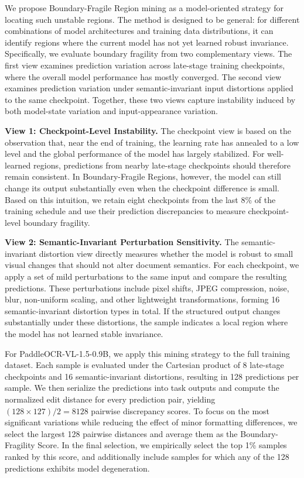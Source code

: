 \documentclass[11pt, a4paper,logo,  copyright, nonumbering]{paddleocr}
\begin{document}
We propose Boundary-Fragile Region mining as a model-oriented strategy for locating such unstable regions. The method is designed to be general: for different combinations of model architectures and training data distributions, it can identify regions where the current model has not yet learned robust invariance. Specifically, we evaluate boundary fragility from two complementary views. The first view examines prediction variation across late-stage training checkpoints, where the overall model performance has mostly converged. The second view examines prediction variation under semantic-invariant input distortions applied to the same checkpoint. Together, these two views capture instability induced by both model-state variation and input-appearance variation.

\textbf{View 1: Checkpoint-Level Instability.} The checkpoint view is based on the observation that, near the end of training, the learning rate has annealed to a low level and the global performance of the model has largely stabilized. For well-learned regions, predictions from nearby late-stage checkpoints should therefore remain consistent. In Boundary-Fragile Regions, however, the model can still change its output substantially even when the checkpoint difference is small. Based on this intuition, we retain eight checkpoints from the last 8\% of the training schedule and use their prediction discrepancies to measure checkpoint-level boundary fragility.

\textbf{View 2: Semantic-Invariant Perturbation Sensitivity.} The semantic-invariant distortion view directly measures whether the model is robust to small visual changes that should not alter document semantics. For each checkpoint, we apply a set of mild perturbations to the same input and compare the resulting predictions. These perturbations include pixel shifts, JPEG compression, noise, blur, non-uniform scaling, and other lightweight transformations, forming 16 semantic-invariant distortion types in total. If the structured output changes substantially under these distortions, the sample indicates a local region where the model has not learned stable invariance.

For PaddleOCR-VL-1.5-0.9B, we apply this mining strategy to the full training dataset. Each sample is evaluated under the Cartesian product of 8 late-stage checkpoints and 16 semantic-invariant distortions, resulting in 128 predictions per sample. We then serialize the predictions into task outputs and compute the normalized edit distance for every prediction pair, yielding \((128 \times 127) / 2 = 8128\) pairwise discrepancy scores. To focus on the most significant variations while reducing the effect of minor formatting differences, we select the largest 128 pairwise distances and average them as the Boundary-Fragility Score. In the final selection, we empirically select the top 1\% samples ranked by this score, and additionally include samples for which any of the 128 predictions exhibits model degeneration.
\end{document}
